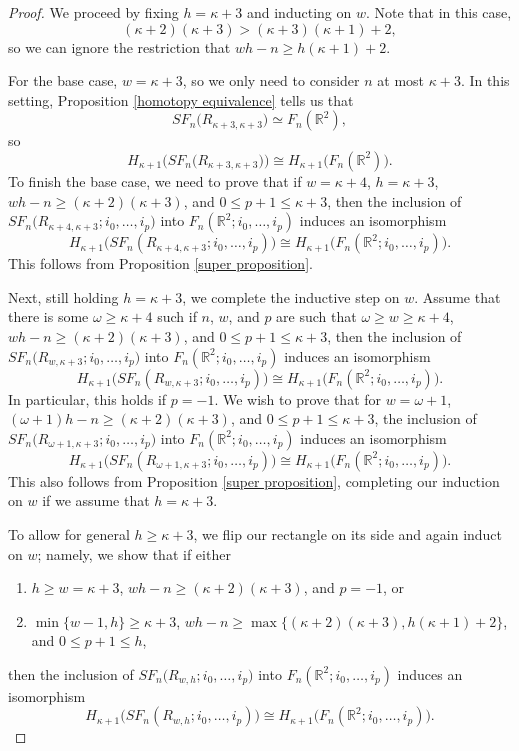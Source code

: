 \documentclass[pagebackref,colorlinks,citecolor=blue,linkcolor=blue,urlcolor=blue,filecolor=blue]{article}
\theoremstyle{definition}\newtheorem{definition}[thm]{Definition}
\theoremstyle{definition}
\newcommand{\R}{\ensuremath{\mathbb{R}}}
\begin{document}
\begin{proof}
We proceed by fixing $h=\kappa+3$ and inducting on $w$.
Note that in this case,
\[
(\kappa+2)(\kappa+3)>(\kappa+3)(\kappa+1)+2,
\]
so we can ignore the restriction that $wh-n\ge h(\kappa+1)+2$.

For the base case, $w=\kappa+3$, so we only need to consider $n$ at most $\kappa+3$.
In this setting, Proposition \ref{homotopy equivalence} tells us that
\[
SF_{n}\big(R_{\kappa+3,\kappa+3})\simeq F_{n}(\R^{2}),
\] 
so 
\[
H_{\kappa+1}\big(SF_{n}\big(R_{\kappa+3,\kappa+3})\big)\cong H_{\kappa+1}\big(F_{n}(\R^{2})\big).
\]
To finish the base case, we need to prove that if $w=\kappa+4$, $h=\kappa+3$, $wh-n\ge(\kappa+2)(\kappa+3)$, and $0\le  p+1\le \kappa+3$, then the inclusion of $SF_{n}\big(R_{\kappa+4,\kappa+3};i_{0}, \dots, i_{p})$ into $F_{n}(\R^{2}; i_{0}, \dots, i_{p})$ induces an isomorphism 
\[
H_{\kappa+1}\big(SF_{n}(R_{\kappa+4, \kappa+3};i_{0}, \dots, i_{p})\big)\cong H_{\kappa+1}\big(F_{n}(\R^{2};i_{0}, \dots, i_{p})\big).
\]
This follows from Proposition \ref{super proposition}.

Next, still holding $h=\kappa+3$, we complete the inductive step on $w$. 
Assume that there is some $\omega\ge \kappa+4$ such if $n$, $w$, and $p$ are such that $\omega\ge w\ge \kappa+4$, $wh-n\ge(\kappa+2)(\kappa+3)$, and $0\le p+1\le \kappa+3$, then the inclusion of $SF_{n}\big(R_{w,\kappa+3};i_{0}, \dots, i_{p})$ into $F_{n}(\R^{2}; i_{0}, \dots, i_{p})$ induces an isomorphism 
\[
H_{\kappa+1}\big(SF_{n}(R_{w, \kappa+3};i_{0}, \dots, i_{p})\big)\cong H_{\kappa+1}\big(F_{n}(\R^{2};i_{0}, \dots, i_{p})\big).
\]
In particular, this holds if $p=-1$.
We wish to prove that for $w=\omega+1$, $(\omega+1)h-n\ge(\kappa+2)(\kappa+3)$, and $0\le p+1\le \kappa+3$, the inclusion of $SF_{n}\big(R_{\omega+1,\kappa+3};i_{0}, \dots, i_{p})$ into $F_{n}(\R^{2}; i_{0}, \dots, i_{p})$ induces an isomorphism 
\[
H_{\kappa+1}\big(SF_{n}(R_{\omega+1, \kappa+3};i_{0}, \dots, i_{p})\big)\cong H_{\kappa+1}\big(F_{n}(\R^{2};i_{0}, \dots, i_{p})\big).
\]
This also follows from Proposition \ref{super proposition}, completing our induction on $w$ if we assume that $h=\kappa+3$.

To allow for general $h\ge \kappa+3$, we flip our rectangle on its side and again induct on $w$; namely, we show that if either 
\begin{enumerate}
    \item $h\ge w=\kappa+3$, $wh-n\ge(\kappa+2)(\kappa+3)$, and $p=-1$, or
    \item $\min\{w-1, h\}\ge \kappa+3$, $wh-n\ge  \max\big\{(\kappa+2)(\kappa+3), h(\kappa+1)+2\big\}$, and $0\le p+1\le h$,
\end{enumerate}
then the inclusion of $SF_{n}\big(R_{w,h};i_{0}, \dots, i_{p})$ into $F_{n}(\R^{2}; i_{0}, \dots, i_{p})$ induces an isomorphism 
\[
H_{\kappa+1}\big(SF_{n}(R_{w, h};i_{0}, \dots, i_{p})\big)\cong H_{\kappa+1}\big(F_{n}(\R^{2};i_{0}, \dots, i_{p})\big).
\]


\end{proof}
\end{document}
